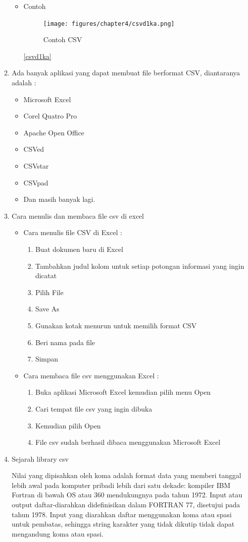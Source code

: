 \begin{enumerate}
\begin{itemize}
			\item Contoh 
				\begin{figure} [ht]
					\centerline{\texttt{[image: figures/chapter4/csvd1ka.png]}}
						\caption{Contoh CSV}
							\label{Contoh CSV}
				\end{figure}
			\ref{csvd1ka}
		\end{itemize}
		
		
	
	
	\item Ada banyak aplikasi yang dapat membuat file berformat CSV, diantaranya adalah :
				\begin{itemize}
					\item Microsoft Excel
					\item Corel Quatro Pro
					\item Apache Open Office
					\item CSVed
					\item CSVstar
					\item CSVpad
					\item Dan masih banyak lagi.
				\end{itemize}
		\item Cara menulis dan membaca file csv di excel		
	\begin{itemize}
	\item Cara menulis file CSV di Excel :
				\begin{enumerate}
					\item Buat dokumen baru di Excel
					\item Tambahkan judul kolom untuk setiap potongan informasi yang ingin dicatat
					\item Pilih File
					\item Save As
					\item Gunakan kotak menurun untuk memilih format CSV 
					\item Beri nama pada file
					\item Simpan
				\end{enumerate}
	\item Cara membaca file csv menggunakan Excel :
				\begin{enumerate}
					\item Buka aplikasi Microsoft Excel kemudian pilih menu Open
					\item Cari tempat file csv yang ingin dibuka 
					\item Kemudian pilih Open
					\item File csv sudah berhasil dibaca menggunakan Microsoft Excel
				\end{enumerate}
	\end{itemize}
	\item Sejarah library csv
		\par Nilai yang dipisahkan oleh koma adalah format data yang memberi tanggal lebih awal pada komputer pribadi lebih dari satu dekade: kompiler IBM Fortran di bawah OS atau 360 mendukungnya pada tahun 1972. Input atau output daftar-diarahkan didefinisikan dalam FORTRAN 77, disetujui pada tahun 1978. Input yang diarahkan daftar menggunakan koma atau spasi untuk pembatas, sehingga string karakter yang tidak dikutip tidak dapat mengandung koma atau spasi.
		

\end{enumerate}
